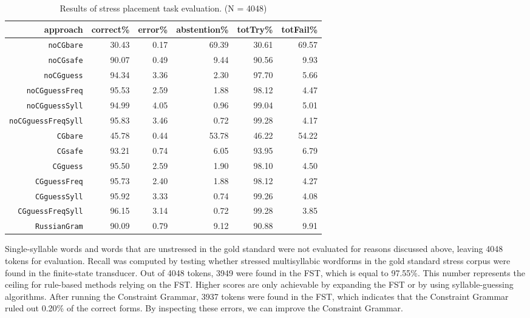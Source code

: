 \documentclass[11pt]{article}
\begin{document}
\begin{table*}[t]
  \centering
  \begin{tabular}{r | r r r | r r }
    approach & correct\% & error\% & abstention\% & totTry\% & totFail\% \\
    \hline
    \hline
    {\small {\tt noCGbare}} & 30.43 & 0.17 & 69.39 & 30.61 & 69.57 \\
    {\small {\tt noCGsafe}} & 90.07 & 0.49 & 9.44 & 90.56 & 9.93 \\
    {\small {\tt noCGguess}} & 94.34 & 3.36 & 2.30 & 97.70 & 5.66 \\
    {\small {\tt noCGguessFreq}} & 95.53 & 2.59 & 1.88 & 98.12 & 4.47 \\
    {\small {\tt noCGguessSyll}} & 94.99 & 4.05 & 0.96 & 99.04 & 5.01 \\
    {\small {\tt noCGguessFreqSyll}} & 95.83 & 3.46 & 0.72 & 99.28 & 4.17 \\
    \hline
    {\small {\tt CGbare}} & 45.78 & 0.44 & 53.78 & 46.22 & 54.22 \\
    {\small {\tt CGsafe}} & 93.21 & 0.74 & 6.05 & 93.95 & 6.79 \\
    {\small {\tt CGguess}} & 95.50 & 2.59 & 1.90 & 98.10 & 4.50 \\
    {\small {\tt CGguessFreq}} & 95.73 & 2.40 & 1.88 & 98.12 & 4.27 \\
    {\small {\tt CGguessSyll}} & 95.92 & 3.33 & 0.74 & 99.26 & 4.08 \\
    {\small {\tt CGguessFreqSyll}} & 96.15 & 3.14 & 0.72 & 99.28 & 3.85 \\
    \hline
    {\small {\tt RussianGram}} & 90.09 & 0.79 & 9.12 & 90.88 & 9.91
  \end{tabular}
  \caption{Results of stress placement task evaluation. (N = 4048)}
  \label{tab:results}
\end{table*}

Single-syllable words and words that are unstressed in the gold standard were
not evaluated for reasons discussed above, leaving 4048 tokens for evaluation.
Recall was computed by testing whether stressed 
multisyllabic wordforms in the gold standard stress corpus were found in the 
finite-state transducer. Out of 4048 tokens, 3949 were found in the FST, which is equal to 97.55\%.
This number represents the ceiling for rule-based methods relying on the FST.
Higher scores are only achievable by expanding the FST or by using syllable-guessing algorithms.
After running the Constraint Grammar, 3937 tokens were found in the FST, which
indicates that the Constraint Grammar ruled out 0.20\% of the correct forms.
By inspecting these errors, we can improve the Constraint Grammar.
\end{document}
